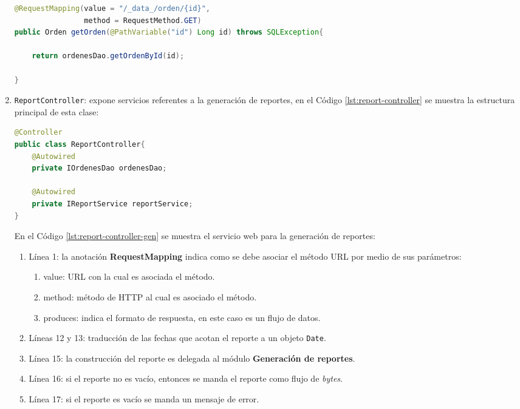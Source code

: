 \begin{enumerate}
\begin{lstlisting}[language=Java, caption={Servicio web para obtener una orden de reposición.}, captionpos=b, label={lst:get-orden-data-controller}]
@RequestMapping(value = "/_data_/orden/{id}",
				method = RequestMethod.GET)
public Orden getOrden(@PathVariable("id") Long id) throws SQLException{

	return ordenesDao.getOrdenById(id);

}
\end{lstlisting}

	\item \texttt{ReportController}: expone servicios referentes a la generación de reportes, en el Código \ref{lst:report-controller} se muestra la estructura principal de esta clase:
\begin{lstlisting}[language=Java, caption={Controlador para exponer servicios web de generación de reportes.}, captionpos=b, label={lst:report-controller}]
@Controller
public class ReportController{
	@Autowired
	private IOrdenesDao ordenesDao;
	
	@Autowired
	private IReportService reportService;
}
\end{lstlisting}

	En el Código \ref{lst:report-controller-gen} se muestra el servicio web para la generación de reportes:
	\begin{enumerate}
		\item Línea 1: la anotación \textbf{RequestMapping} indica como se debe asociar el método URL por medio de sus parámetros:
		\begin{enumerate}
			\item value: URL con la cual es asociada el método.
			\item method: método de HTTP al cual es asociado el método.
			\item produces: indica el formato de respuesta, en este caso es un flujo de datos.
		\end{enumerate}
		\item Líneas 12 y 13: traducción de las fechas que acotan el reporte a un objeto \texttt{Date}.
		\item Línea 15: la construcción del reporte es delegada al módulo \textbf{Generación de reportes}.
		\item Línea 16: si el reporte no es vacío, entonces se manda el reporte como flujo de \textit{bytes}.
		\item Línea 17: si el reporte es vacío se manda un mensaje de error.
	\end{enumerate}


\end{enumerate}
